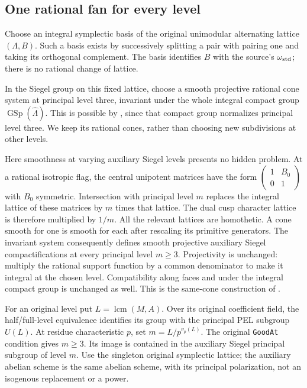 \subsection*{One rational fan for every level}

Choose an integral symplectic basis of the original unimodular
alternating lattice $(\Lambda,B)$.  Such a basis exists by successively
splitting a pair with pairing one and taking its orthogonal complement.
The basis identifies $B$ with the source's $\omega_{\rm std}$;
there is no rational change of lattice.

In the Siegel group on this fixed lattice, choose a smooth projective
rational cone system at principal level three, invariant under the
whole integral compact group $\operatorname{GSp}(\widehat\Lambda)$.
This is possible by
\cite[Proposition 2.8(1)--(2)]{level-system-projective}, since that
compact group normalizes principal level three.  We keep its rational
cones, rather than choosing new subdivisions at other levels.

Here smoothness at varying auxiliary Siegel levels presents no hidden
problem.  At a rational isotropic flag, the central unipotent matrices
have the form $\left(\begin{smallmatrix}1&B_0\\0&1\end{smallmatrix}\right)$
with $B_0$ symmetric.  Intersection with principal level $m$ replaces
the integral lattice of these matrices by $m$ times that lattice.
The dual cusp character lattice is therefore multiplied by $1/m$.
All the relevant lattices are homothetic.  A cone smooth for one
is smooth for each after rescaling its primitive generators.
The invariant system consequently defines smooth projective auxiliary
Siegel compactifications at every principal level $m\geq3$.
Projectivity is unchanged: multiply the rational support function
by a common denominator to make it integral at the chosen level.
Compatibility along faces and under the integral compact group
is unchanged as well.  This is the same-cone construction of
\cite[Construction 7.3.1.6 and the proof of Theorem 7.3.3.4]{level-system-lan}.

For an original level put $L=\operatorname{lcm}(M,A)$.
Over its original coefficient field, the half/full-level equivalence
identifies its group with the principal PEL subgroup $U(L)$.
At residue characteristic $p$, set $m=L/p^{v_p(L)}$.
The original \texttt{GoodAt} condition gives $m\geq3$.
Its image is contained in the auxiliary Siegel principal subgroup
of level $m$.  Use the singleton original symplectic lattice; the
auxiliary abelian scheme is the same abelian scheme, with its
principal polarization, not an isogenous replacement or a power.


